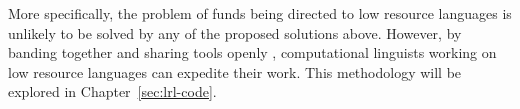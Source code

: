 More specifically, the problem of funds being directed to low resource languages is unlikely to be solved by any of the proposed solutions above. However, by banding together and sharing tools openly \citep{streiter2006implementing}, computational linguists working on low resource languages can expedite their work. This methodology will be explored in Chapter~\ref{sec:lrl-code}.


